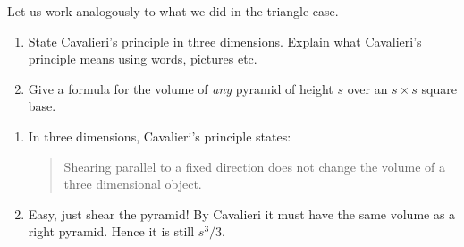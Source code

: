 \documentclass[nooutcomes,noauthor,handout,hints,12pt]{ximera}
\begin{document}
\begin{question}
  Let us work analogously to what we did in the triangle case.
  \begin{enumerate}
  \item State Cavalieri's principle in three dimensions. Explain what Cavalieri's principle means using words, pictures etc.
  \item Give a formula for the volume of \emph{any} pyramid of height $s$ over an $s\times
    s$ square base.
  \end{enumerate}
    \begin{freeResponse}
      \begin{enumerate}
      \item In three dimensions, Cavalieri's principle states:
        \begin{quote}
          Shearing parallel to a fixed direction does not change the
          volume of a three dimensional object.
        \end{quote}
      \item Easy, just shear the pyramid! By Cavalieri it must have
        the same volume as a right pyramid. Hence it is still $s^3/3$.
      \end{enumerate}
    \end{freeResponse}
\end{question}
\end{document}
